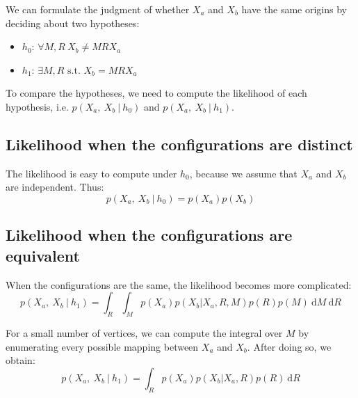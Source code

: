 \documentclass{article} %
\begin{document}
We can formulate the judgment of whether $X_a$ and $X_b$ have the same
origins by deciding about two hypotheses:

\begin{itemize}
\itemsep1pt\parskip0pt
\item
  $h_0$: $\forall M,R\ X_b\neq MRX_a$
\item
  $h_1$: $\exists M,R\textrm{ s.t. } X_b=MRX_a$
\end{itemize}

To compare the hypotheses, we need to compute the likelihood of each
hypothesis, i.e. $p(X_a,\ X_b\ \vert \ h_0)$ and $p(X_a,\ X_b\ \vert \
h_1)$.

\subsection{Likelihood when the configurations are distinct}

The likelihood is easy to compute under $h_0$, because we assume that
$X_a$ and $X_b$ are independent. Thus:
\begin{equation}
  p(X_a,\ X_b\ \vert \ h_0)=p(X_a)p(X_b)
\end{equation}

\subsection{Likelihood when the configurations are equivalent}

When the configurations are the same, the likelihood becomes more
complicated:
\begin{equation} 
  p(X_a,\ X_b\ \vert \ h_1)=\int_R\int_M p(X_a) p(X_b\vert X_a,R,M) p(R) p(M)\ \mathrm{d}M\ \mathrm{d}R
\end{equation}

For a small number of vertices, we can compute the integral over $M$
by enumerating every possible mapping between $X_a$ and $X_b$. After
doing so, we obtain:
\begin{equation} 
  p(X_a,\ X_b\ \vert \ h_1)=\int_R p(X_a) p(X_b\vert X_a,R) p(R)\ \mathrm{d}R
\end{equation}
\end{document}
